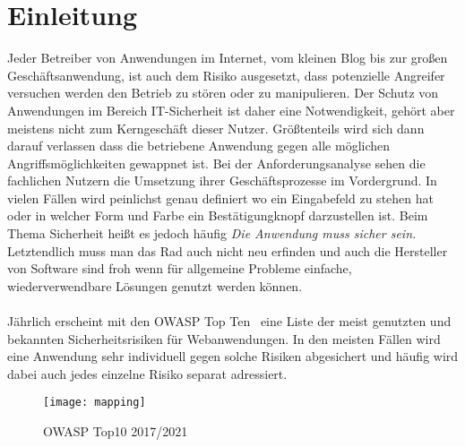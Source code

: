 \chapter{Einleitung}


Jeder Betreiber von Anwendungen im Internet, vom kleinen Blog bis zur großen Geschäftsanwendung, ist auch dem Risiko ausgesetzt, dass potenzielle Angreifer versuchen werden den Betrieb zu stören oder zu manipulieren. Der Schutz von Anwendungen im Bereich IT-Sicherheit ist daher eine Notwendigkeit, gehört aber meistens nicht zum Kerngeschäft dieser Nutzer. Größtenteils wird sich dann darauf verlassen dass die betriebene Anwendung gegen alle möglichen Angriffsmöglichkeiten gewappnet ist. Bei der Anforderungsanalyse sehen die fachlichen Nutzern die Umsetzung ihrer Geschäftsprozesse im Vordergrund. In vielen Fällen wird peinlichst genau definiert wo ein Eingabefeld zu stehen hat oder in welcher Form und Farbe ein Bestätigungknopf darzustellen ist. Beim Thema Sicherheit heißt es jedoch häufig \glqq\emph{Die Anwendung muss sicher sein.}\grqq \\
Letztendlich muss man das Rad auch nicht neu erfinden und auch die Hersteller von Software sind froh wenn für allgemeine Probleme einfache, wiederverwendbare Lösungen genutzt werden können. \\\\

Jährlich erscheint mit den OWASP Top Ten~\cite{owasp10}  eine Liste der meist genutzten und bekannten Sicherheitsrisiken für Webanwendungen. In den meisten Fällen wird eine Anwendung sehr individuell gegen solche Risiken abgesichert und häufig wird dabei auch jedes einzelne Risiko separat adressiert. \\


\begin{figure}[h]
  \begin{center}
    \texttt{[image: mapping]}
    \caption{OWASP Top10 2017/2021~\cite{owasp10}}
    \label{fig.topten}
  \end{center}
\end{figure}


